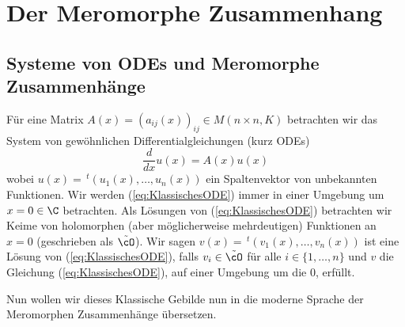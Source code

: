 \chapter{Der Meromorphe Zusammenhang}
\begin{comment}
Alle MeromZsh sind $\cD$-Moduln aber nicht andersherum?
\end{comment}

\section{Systeme von ODEs und Meromorphe Zusammenhänge}
\cite[Chap 5.1.1]{hotta2007d} %
Für eine Matrix $A(x)=(a_{ij}(x))_{ij}\in M(n\times n,K)$ betrachten wir das
System von gewöhnlichen Differentialgleichungen (kurz ODEs)
\begin{equation}
\label{eq:KlassischesODE}
\frac{d}{dx}u(x)=A(x)u(x)
\end{equation}
wobei $u(x)=\,^t(u_1(x),\dots,u_n(x))$ ein Spaltenvektor von unbekannten
Funktionen. Wir werden (\ref{eq:KlassischesODE}) immer in einer Umgebung um
$x=0\in\C$ betrachten. Als Lösungen von (\ref{eq:KlassischesODE}) betrachten
wir Keime von holomorphen (aber möglicherweise mehrdeutigen)
Funktionen an $x=0$ (geschrieben als $\tilde\cO$).
 Wir sagen $v(x)=\,^t(v_1(x),\dots,v_n(x))$ ist
eine Lösung von (\ref{eq:KlassischesODE}), falls $ v_i\in\tilde \cO$ für alle
$i\in\{1,\dots,n\}$ und $v$ die Gleichung (\ref{eq:KlassischesODE}),
auf einer Umgebung um die $0$, erfüllt.

\begin{comment}
TODO: zeige, das der lösungsraum die eigenschaften von $\cD$-Moduln erfüllt\\
siehe "alternativer Zugang"
\end{comment}

Nun wollen wir dieses Klassische Gebilde nun in die moderne Sprache der
Meromorphen Zusammenhänge übersetzen.

